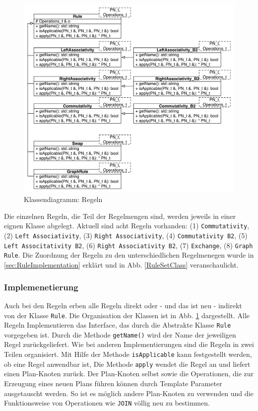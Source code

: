 \begin{figure}[ht]
  \centering
  \includegraphics[height=\textwidth]{04_Implementierung/Rules.pdf}
  \caption{Klassendiagramm: Regeln}
  \label{RuleClassDiagram}
\end{figure}

Die einzelnen Regeln, die Teil der Regelmengen sind, werden jeweils in einer eignen Klasse abgelegt. Aktuell sind acht Regeln vorhanden: (1) \texttt{Commutativity}, (2) \texttt{Left Associativity}, (3) \texttt{Right Associativity}, (4) \texttt{Commutativity B2}, (5) \texttt{Left Associtativity B2}, (6) \texttt{Right Associativity B2}, (7) \texttt{Exchange}, (8) \texttt{Graph Rule}. Die Zuordnung der Regeln zu den unterschiedlichen Regelmenegen wurde in \ref{sec:RuleImplementation} erklärt und in Abb. \ref{RuleSetClass} veranschaulicht.

\subsubsection{Implemenetierung}


Auch bei den Regeln erben alle Regeln direkt oder - und das ist neu - indirekt von der Klasse \texttt{Rule}. Die Organisation der Klassen ist in Abb. \ref{RuleClassDiagram} dargestellt. Alle Regeln Implementieren das Interface, das durch die Abstrakte Klasse \texttt{Rule} vorgegeben ist. Durch die Methode \texttt{getName()} wird der Name der jeweiligen Regel zurückgeliefert. Wie bei anderen Implementierungen sind die Regeln in zwei Teilen organisiert. Mit Hilfe der Methode \texttt{isApplicable} kann festgestellt werden, ob eine Regel anwendbar ist, Die Methode \texttt{apply} wendet die Regel an und liefert einen Plan-Knoten zurück. Der Plan-Knoten selbst sowie die Operationen, die zur Erzeugung eines neuen Plans führen können durch Template Parameter ausgetauscht werden. So ist es möglich andere Plan-Knoten zu verwenden und die Funktionsweise von Operationen wie \texttt{JOIN} völlig neu zu bestimmen.


